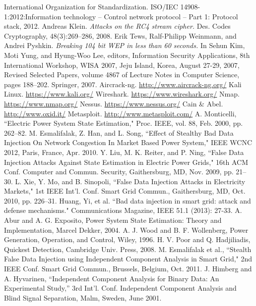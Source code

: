 \begin{thebibliography}{99}
 International Organization for Standardization. ISO/IEC 14908-1:2012:Information technology – Control network protocol – Part 1: Protocol stack, 2012.
 Andreas Klein. \emph{Attacks on the RC4 stream cipher.} Des. Codes Cryptography, 48(3):269–286, 2008.
 Erik Tews, Ralf-Philipp Weinmann, and Andrei Pyshkin. \emph{Breaking 104 bit WEP in less than 60 seconds.} In Sehun Kim, Moti Yung, and Hyung-Woo Lee, editors, Information Security Applications, 8th International Workshop, WISA 2007, Jeju Island, Korea, August 27-29, 2007, Revised Selected Papers, volume 4867 of Lecture Notes in Computer Science, pages 188–202. Springer, 2007.
 Aircrack-ng. \url{http://www.aircrack-ng.org/}
 Kali Linux. \url{https://www.kali.org/}
 Wireshark. \url{https://www.wireshark.org/}
 Nmap. \url{https://www.nmap.org/}
 Nessus. \url{https://www.nessus.org/}
 Cain \& Abel. \url{http://www.oxid.it/}
 Metasploit. \url{http://www.metasploit.com/}
 A. Monticelli, ``Electric Power System State Estimation," Proc. IEEE, vol. 88, Feb. 2000, pp. 262–82.
 M. Esmalifalak, Z. Han, and L. Song, ``Effect of Stealthy Bad Data Injection On Network Congestion In Market Based Power System," IEEE WCNC 2012, Paris, France, Apr. 2010.
 Y. Liu, M. K. Reiter, and P. Ning, ``False Data Injection Attacks Against State Estimation in Electric Power Grids," 16th ACM Conf. Computer and Commun. Security, Gaithersburg, MD, Nov. 2009, pp. 21–30.
 L. Xie, Y. Mo, and B. Sinopoli, ``False Data Injection Attacks in Electricity Markets," 1st IEEE Int’l. Conf. Smart Grid Commun., Gaithersburg, MD, Oct. 2010, pp. 226–31.
 Huang, Yi, et al. ``Bad data injection in smart grid: attack and defense mechanisms." Communications Magazine, IEEE 51.1 (2013): 27-33.
 A. Abur and A. G. Exposito, Power System State Estimation: Theory and Implementation, Marcel Dekker, 2004.
 A. J. Wood and B. F. Wollenberg, Power Generation, Operation, and Control, Wiley, 1996.
 H. V. Poor and Q. Hadjiliadis, Quickest Detection, Cambridge Univ. Press, 2008.
 M. Esmalifalak et al., ``Stealth False Data Injection using Independent Component Analysis in Smart Grid," 2nd IEEE Conf. Smart Grid Commun., Brussels, Belgium, Oct. 2011.
 J. Himberg and A. Hyvarinen, “Independent Component Analysis for Binary Data: An Experimental Study,” 3rd Int’l. Conf. Independent Component Analysis and Blind Signal Separation, Malm, Sweden, June 2001.
\end{thebibliography}